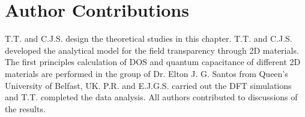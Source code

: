 \section{Author Contributions}
\label{sec:qc-author-contributions}
T.T. and C.J.S. design the theoretical studies in this
chapter. T.T. and C.J.S. developed the analytical model for the field
transparency through 2D materials. The first principles calculation of
DOS and quantum capacitance of different 2D materials are performed in
the group of Dr. Elton J. G. Santos from Queen's University of
Belfast, UK. P.R. and E.J.G.S. carried out the DFT simulations and
T.T. completed the data analysis. All authors contributed to
discussions of the results.

